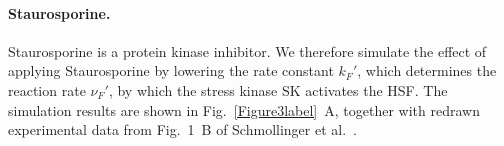 \documentclass[oneside, 10pt, a4paper, twocolumn]{article}
\begin{document}









\paragraph{Staurosporine.}

Staurosporine is a protein kinase inhibitor.
We therefore simulate the effect of applying Staurosporine by lowering the rate constant $k_F'$, 
which determines the reaction rate $\nu_F'$, by which the stress kinase SK activates the HSF. 
The simulation results are shown in Fig.~\ref{Figure3label}~A, together with redrawn 
experimental data from Fig.~1~B of Schmollinger et al.~\cite{Schmollinger2013}.
\end{document}
